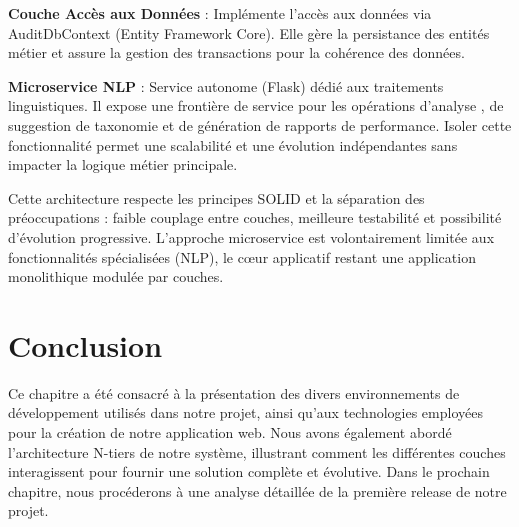 \noindent \textbf{Couche Accès aux Données} : Implémente l'accès aux données via AuditDbContext (Entity Framework Core). Elle gère la persistance des entités métier et assure la gestion des transactions pour la cohérence des données.

\noindent \textbf{Microservice NLP} : Service autonome (Flask) dédié aux traitements linguistiques. Il expose une frontière de service pour les opérations d'analyse , de suggestion de taxonomie et de génération de rapports de performance. Isoler cette fonctionnalité permet une scalabilité et une évolution indépendantes sans impacter la logique métier principale.

\noindent Cette architecture respecte les principes SOLID et la séparation des préoccupations : faible couplage entre couches, meilleure testabilité et possibilité d'évolution progressive. L'approche microservice est volontairement limitée aux fonctionnalités spécialisées (NLP), le cœur applicatif restant une application monolithique modulée par couches.
\section*{Conclusion} 
\noindent Ce chapitre a été consacré à la présentation des divers environnements de développement utilisés dans notre projet, ainsi qu'aux technologies employées pour la création de notre application web. Nous avons également abordé l'architecture N-tiers de notre système, illustrant comment les différentes couches interagissent pour fournir une solution complète et évolutive. Dans le prochain chapitre, nous procéderons à une analyse détaillée de la première release de notre projet.
